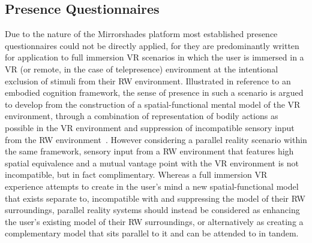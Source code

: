 
\subsection{Presence Questionnaires}

Due to the nature of the Mirrorshades platform most established presence questionnaires could not be directly applied,  for they are predominantly written for application to full immersion VR scenarios in which the user is immersed in a VR (or remote, in the case of telepresence) environment at the intentional exclusion of stimuli from their RW environment. Illustrated in reference to an embodied cognition framework, the sense of presence in such a scenario is argued to develop from the construction of a spatial-functional mental model of the VR environment, through a combination of representation of bodily actions as possible in the VR environment and suppression of incompatible sensory input from the RW environment~\cite{Schubert2001}. However considering a parallel reality scenario within the same framework, sensory input from a RW environment that features high spatial equivalence and a mutual vantage point with the VR environment is not incompatible, but in fact complimentary. Whereas a full immersion VR experience attempts to create in the user's mind a new spatial-functional model that exists separate to, incompatible with and suppressing the model of their RW surroundings, parallel reality systems should instead be considered as enhancing the user's existing model of their RW surroundings, or alternatively as creating a complementary model that sits parallel to it and can be attended to in tandem.

